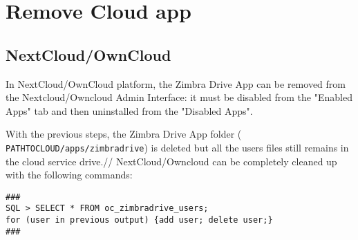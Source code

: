 \section{Remove Cloud app}
\subsection{NextCloud/OwnCloud}\label{subsec:nextcloudOwncloudUninstallation}
    In NextCloud/OwnCloud platform, the Zimbra Drive App can be removed from the Nextcloud/Owncloud Admin Interface:
    it must be disabled from the "Enabled Apps" tab and then uninstalled from the "Disabled Apps".
    
    With the previous steps, the Zimbra Drive App folder ( \texttt{PATH\textunderscore TO\textunderscore CLOUD/apps/zimbradrive})
    is deleted but all the users files still remains in the cloud service drive.//
    NextCloud/Owncloud can be completely cleaned up with the following commands:

    \begin{verbatim}
###
SQL > SELECT * FROM oc_zimbradrive_users;
for (user in previous output) {add user; delete user;}
###
    \end{verbatim}